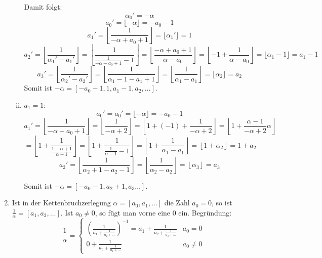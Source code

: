 \begin{enumerate}[(1)]
\begin{enumerate}[(i)]
		Damit folgt:
		\[ \alpha_0' = -\alpha \]
		\[ a_0' = \lfloor -\alpha \rfloor = -a_0 - 1   \]
		\[ a_1' = \left\lfloor \frac{1}{-\alpha + a_0 + 1} \right\rfloor = \lfloor \alpha_1' \rfloor = 1 \]
		\[ a_2' = \left\lfloor \frac{1}{\alpha_1' - a_1' } \right\rfloor 
			= \left\lfloor \frac{1}{\frac{1}{-\alpha + a_0 + 1} - 1} \right\rfloor
			= \left\lfloor \frac{-\alpha + a_0 + 1}{\alpha - a_0} \right\rfloor 
			= \left\lfloor -1 + \frac{1}{\alpha - a_0 } \right\rfloor
			= \lfloor \alpha_1 - 1 \rfloor = a_1 - 1 \]
		\[ a_3' = \left\lfloor \frac{1}{\alpha_2' - a_2' } \right\rfloor
			= \left\lfloor \frac{1}{\alpha_1 - 1 - a_1 + 1} \right\rfloor
			= \left\lfloor \frac{1}{\alpha_1 - a_1} \right\rfloor
			= \lfloor \alpha_2 \rfloor 
			= a_2 \]
		Somit ist $-\alpha = [-a_0 - 1, 1, a_1 - 1, a_2, \ldots ]$.
		\item $a_1 = 1 $:
		\[ a_0' = a_0' = \lfloor -\alpha \rfloor = -a_0 - 1   \]
		\[ a_1' = \left\lfloor \frac{1}{-\alpha + a_0 + 1} \right\rfloor 
			= \left\lfloor \frac{1}{-\alpha + 2} \right\rfloor
			= \left\lfloor 1 + (-1) + \frac{1}{-\alpha + 2} \right\rfloor
			= \left\lfloor 1 +  \frac{\alpha - 1}{-\alpha + 2} \alpha\right\rfloor \]
		\[	= \left\lfloor 1 + \frac{1}{\frac{1-\alpha + 1}{\alpha - 1}} \right\rfloor
			= \left\lfloor 1 + \frac{1}{\frac{1}{\alpha - 1} - 1} \right\rfloor
			= \left\lfloor 1 + \frac{1}{\alpha_1 - a_1} \right\rfloor
			= \left\lfloor 1 + \alpha_2\right\rfloor
			= 1 + a_2 \]
		\[ a_2' = \left\lfloor \frac{1}{\alpha_2 + 1 - a_2 - 1} \right\rfloor
			= \left\lfloor \frac{1}{\alpha_2 - a_2} \right\rfloor
			= \left\lfloor \alpha_3 \right\rfloor
			= a_3 \]
		
		Somit ist $-\alpha = [-a_0 - 1, a_2 + 1, a_3 \ldots ]$.

	\end{enumerate}
	\item Ist in der Kettenbruchzerlegung $\alpha = [a_0, a_1, \dots]$ die
		Zahl $a_0 = 0$, so ist $\frac{1}{\alpha} = [a_1, a_2, \dots]$.
		Ist $a_0 \not= 0$, so fügt man vorne eine $0$ ein. Begründung:
		\[ \frac{1}{\alpha} = 
			\begin{cases}
				\left(\frac{1}{a_1+\frac{1}{a_2+\dots}}\right)^{-1} =
				a_1 + \frac{1}{a_2+\frac{1}{a_3+\dots}} &a_0 = 0 \\
				0 + \frac{1}{a_0+\frac{1}{a_1+\dots}} &a_0 \not= 0
			\end{cases}
				\]
\end{enumerate}
